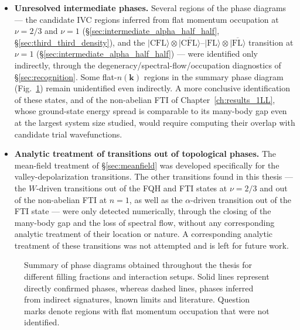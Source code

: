 \begin{itemize}
    \item \textbf{Unresolved intermediate phases.} Several regions of the phase diagrams --- the candidate IVC regions inferred from flat momentum occupation at $\nu = 2/3$ and $\nu = 1$ (\S\ref{sec:intermediate_alpha_half_half}, \S\ref{sec:third_third_density}), and the $|\mathrm{CFL}\rangle \otimes \overline{|\mathrm{CFL}\rangle}$--$|\mathrm{FL}\rangle \otimes \overline{|\mathrm{FL}\rangle}$ transition at $\nu = 1$ (\S\ref{sec:intermediate_alpha_half_half}) --- were identified only indirectly, through the degeneracy/spectral-flow/occupation diagnostics of \S\ref{sec:recognition}. Some flat-$n(\mathbf{k})$ regions in the summary phase diagram (Fig.~\ref{fig:summary}) remain unidentified even indirectly. A more conclusive identification of these states, and of the non-abelian FTI of Chapter~\ref{ch:results_1LL}, whose ground-state energy spread is comparable to its many-body gap even at the largest system size studied, would require computing their overlap with candidate trial wavefunctions.
    
        \item \textbf{Analytic treatment of transitions out of topological phases.} The mean-field treatment of \S\ref{sec:meanfield} was developed specifically for the valley-depolarization transitions. The other transitions found in this thesis --- the $W$-driven transitions out of the FQH and FTI states at $\nu = 2/3$ and out of the non-abelian FTI at $n=1$, as well as the $\alpha$-driven transition out of the FTI state --- were only detected numerically, through the closing of the many-body gap and the loss of spectral flow, without any corresponding analytic treatment of their location or nature. A corresponding analytic treatment of these transitions was not attempted and is left for future work.
        

\end{itemize}

    \begin{figure}
        \centering
        
        \caption{Summary of phase diagrams obtained throughout the thesis for different filling fractions and interaction setups. Solid lines represent directly confirmed phases, whereas dashed lines, phases inferred from indirect signatures, known limits and literature. Question marks denote regions with flat momentum occupation that were not identified.}\label{fig:summary}
    \end{figure}